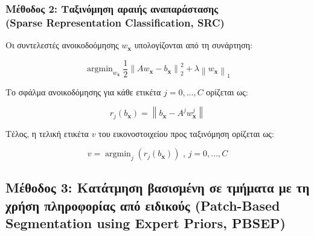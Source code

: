 \documentclass{beamer}
\newcommand{\argminB}{\mathop{\mathrm{argmin}}}
\newcommand\norm[1]{\left\lVert#1\right\rVert}
\begin{document}
\begin{frame}
\frametitle{Μέθοδος 2: Ταξινόμηση αραιής αναπαράστασης \\
(Sparse Representation Classification, SRC)}

Οι συντελεστές ανοικοδοόμησης $w_{\bm{x}}$ υπολογίζονται από τη συνάρτηση:

\begin{equation*}
    \argminB_{w_{\bm{x}}} { \frac{1} {2} \norm { A w_{\bm{x}} - b_{\bm{x}} }_2^2
              + \lambda \norm{w_{\bm{x}}}_1 }
\end{equation*}

Το σφάλμα ανοικοδόμησης για κάθε ετικέτα $j = 0,...,C$ ορίζεται ως:

\begin{equation*} 
    r_j(b_{\bm{x}}) = \norm{ b_{\bm{x}} - A^j w_{\bm{x}}^j }
\end{equation*}

Τέλος, η τελική ετικέτα $v$ του εικονοστοιχείου προς ταξινόμηση ορίζεται ως:

\begin{equation*} 
    v = \argminB_{j} { \left( r_j(b_{\bm{x}}) \right) } \text{ , } j = 0,...,C
\end{equation*}

\end{frame}

 
\subsection{Μέθοδος 3: Κατάτμηση βασισμένη σε τμήματα με τη χρήση πληροφορίας
από ειδικούς (Patch-Based Segmentation using Expert Priors, PBSEP)}
\end{document}
